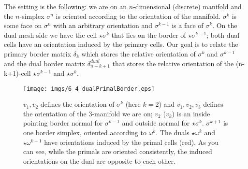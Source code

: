 \begin{appendix}
\label{app:dualborder}
The setting is the following: we are on an $n$-dimensional (discrete) manifold and the $n$-simplex $\sigma^n$ is oriented according to the orientation of the manifold. $\sigma^k$ is some face on $\sigma^n$ with an arbitrary orientation and $\sigma^{k-1}$ is a face of $\sigma^k$. On the dual-mesh side we have the cell $\star \sigma^k$ that lies on the border of $\star \sigma^{k-1}$; both dual cells have an orientation induced by the primary cells. Our goal is to relate the primary border matrix $\delta_k$ which stores the relative orientation of $\sigma^k$ and $\sigma^{k-1}$ 
and the dual border matrix $\delta_{n-k+1}^{dual}$ that stores the relative orientation of the (n-k+1)-cell $\star \sigma^{k-1}$ and $\star \sigma^{k}$.

\begin{figure}[h]
\begin{center}
\texttt{[image: imgs/6\_4\_dualPrimalBorder.eps]}
\end{center}
\caption{$v_1,v_2$ defines the orientation of $\sigma^k$ (here $k=2$) and $v_1,v_2,v_3$ defines the orientation of the 3-manifold we are on; $v_2$ ($v_k$) is an inside pointing border normal for $\sigma^{k-1}$ and outside normal for $\star \sigma^k$. $\sigma^{k+1}$ is one border simplex, oriented according to $\omega^k$. The duals $\star \omega^k$ and $\star \omega^{k-1}$ have orientations induced by the primal cells (red). As you can see, while the primals are oriented consistently, the induced orientations on the dual are opposite to each other.}
\end{figure}


\end{appendix}
